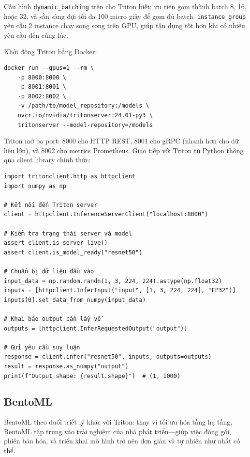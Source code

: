 Cấu hình \texttt{dynamic\_batching} trên cho Triton biết: ưu tiên gom thành batch 8, 16, hoặc 32, và sẵn sàng đợi tối đa 100 micro giây để gom đủ batch. \texttt{instance\_group} yêu cầu 2 instance chạy song song trên GPU, giúp tận dụng tốt hơn khi có nhiều yêu cầu đến cùng lúc.

Khởi động Triton bằng Docker:

\begin{verbatim}
docker run --gpus=1 --rm \
    -p 8000:8000 \
    -p 8001:8001 \
    -p 8002:8002 \
    -v /path/to/model_repository:/models \
    nvcr.io/nvidia/tritonserver:24.01-py3 \
    tritonserver --model-repository=/models
\end{verbatim}

Triton mở ba port: 8000 cho HTTP REST, 8001 cho gRPC (nhanh hơn cho dữ liệu lớn), và 8002 cho metrics Prometheus. Giao tiếp với Triton từ Python thông qua client library chính thức:

\begin{verbatim}
import tritonclient.http as httpclient
import numpy as np

# Kết nối đến Triton server
client = httpclient.InferenceServerClient("localhost:8000")

# Kiểm tra trạng thái server và model
assert client.is_server_live()
assert client.is_model_ready("resnet50")

# Chuẩn bị dữ liệu đầu vào
input_data = np.random.randn(1, 3, 224, 224).astype(np.float32)
inputs = [httpclient.InferInput("input", [1, 3, 224, 224], "FP32")]
inputs[0].set_data_from_numpy(input_data)

# Khai báo output cần lấy về
outputs = [httpclient.InferRequestedOutput("output")]

# Gửi yêu cầu suy luận
response = client.infer("resnet50", inputs, outputs=outputs)
result = response.as_numpy("output")
print(f"Output shape: {result.shape}")  # (1, 1000)
\end{verbatim}

\subsection{BentoML}
\label{subsec:bentoml}

BentoML theo đuổi triết lý khác với Triton: thay vì tối ưu hóa tầng hạ tầng, BentoML tập trung vào trải nghiệm của nhà phát triển---giúp việc đóng gói, phiên bản hóa, và triển khai mô hình trở nên đơn giản và tự nhiên như nhất có thể.

